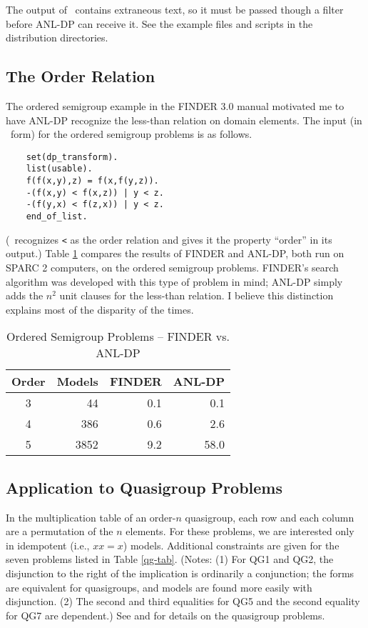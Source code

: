 The output of \otter\ contains extraneous text, so it must be passed
though a filter before ANL-DP can receive it.  See the example files
and scripts in the distribution directories.

\subsection{The Order Relation} \label{order}

The ordered semigroup example in the FINDER 3.0 manual
\cite[Sec. 4.1.5]{finder3} motivated me to have ANL-DP recognize the
less-than relation on domain elements.  The input (in \otter\ form)
for the ordered semigroup problems is as follows.
\begin{verbatim}
    set(dp_transform).
    list(usable).
    f(f(x,y),z) = f(x,f(y,z)).
    -(f(x,y) < f(x,z)) | y < z.
    -(f(y,x) < f(z,x)) | y < z.
    end_of_list.
\end{verbatim}
(\otter\ recognizes \verb:<: as the order relation and gives it 
the property ``order'' in its output.)
Table \ref{order-tab} compares the results of FINDER and ANL-DP, both
run on SPARC 2 computers, on the ordered semigroup problems.  FINDER's
search algorithm was developed with this type of problem in mind;
ANL-DP simply adds the $n^2$ unit clauses for the less-than relation.
I believe this distinction explains most of the disparity of the
times.

\begin{table}[htb] \centering
\caption{Ordered Semigroup Problems -- FINDER vs. ANL-DP} \label{order-tab}
\begin{tabular}{crrr}
Order & Models & FINDER & ANL-DP \\
\hline
3 & 44 & 0.1 & 0.1 \\
4 & 386 & 0.6 &  2.6 \\
5 & 3852 & 9.2 & 58.0 \\
\end{tabular}
\end{table}

\subsection{Application to Quasigroup Problems} \label{qg}

In the multiplication table of an order-$n$ quasigroup, each row and
each column are a permutation of the $n$ elements.  For these problems,
we are interested only in idempotent (i.e., $xx=x$) models.
Additional constraints are given for the seven problems listed in
Table \ref{qg-tab}.  (Notes: (1) For QG1 and QG2, the disjunction to
the right of the implication is ordinarily a conjunction; the forms
are equivalent for quasigroups, and models are found more
easily with disjunction. (2) The second and third equalities for QG5
and the second equality for QG7 are dependent.)  See \cite{qg-survey} and
\cite{qg-slaney-fujita-stickel} for details on the quasigroup problems.

